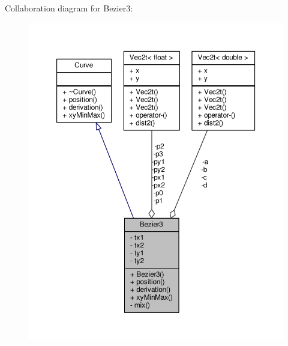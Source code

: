 Collaboration diagram for Bezier3\+:
\nopagebreak
\begin{figure}[H]
\begin{center}
\leavevmode
\includegraphics[width=350pt]{classBezier3__coll__graph}
\end{center}
\end{figure}
